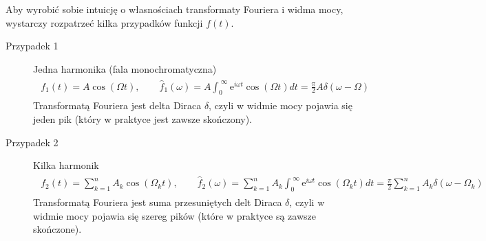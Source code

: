 \documentclass[a4paper,12pt,polish]{sphinxmanual}
\begin{document}
Aby wyrobić sobie intuicję o własnościach transformaty Fouriera i widma mocy, wystarczy rozpatrzeć kilka  przypadków funkcji $f(t)$.
\begin{description}
\item[{Przypadek 1}] \leavevmode
Jedna harmonika  (fala monochromatyczna)
\label{ch2/chII012:equation-eqn23}\begin{gather}
\begin{split}f_1(t) = A \cos (\Omega t), \qquad {\hat f}_1(\omega) = A  \int_{0}^{\; \infty}  \mbox{e}^{i \omega t} \cos(\Omega t)  dt =\frac{\pi }{2}  A  \delta(\omega - \Omega)\end{split}\label{ch2/chII012-eqn23}
\end{gather}
Transformatą Fouriera jest delta Diraca $\delta$, czyli w widmie mocy pojawia się jeden pik (który w praktyce jest zawsze skończony).

\item[{Przypadek 2}] \leavevmode
Kilka harmonik
\label{ch2/chII012:equation-eqn24}\begin{gather}
\begin{split}f_2(t) = \sum_{k=1}^{n} A_k \cos (\Omega_k  t), \qquad {\hat f}_2(\omega) = \sum_{k=1}^{n} A_k  \int_{0}^{\; \infty}  \mbox{e}^{i \omega t} \cos(\Omega_k t)  dt = \frac{\pi}{2}  \sum_{k=1}^{n} A_k   \delta(\omega - \Omega_k)\end{split}\label{ch2/chII012-eqn24}
\end{gather}
Transformatą Fouriera jest suma przesuniętych delt Diraca $\delta$, czyli w widmie mocy pojawia się szereg  pików (które w praktyce są  zawsze skończone).

\end{description}
\end{document}
